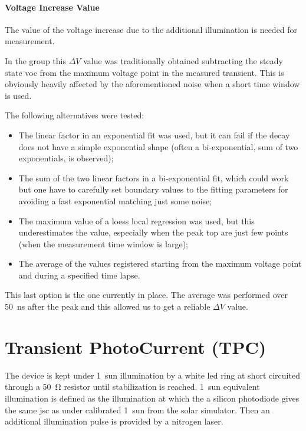 \paragraph{Voltage Increase Value}\label{tpv_deltaV}

The value of the voltage increase due to the additional illumination is needed for  measurement.

In the group this $\Delta V$ value was traditionally obtained subtracting the steady state \gls{voc} from the maximum voltage point in the measured transient. This is obviously heavily affected by the aforementioned noise when a short time window is used.

The following alternatives were tested:
\begin{itemize}
	\item The linear factor in an exponential fit was used, but it can fail if the decay does not have a simple exponential shape (often a bi-exponential, sum of two exponentials, is observed);
	\item The sum of the two linear factors in a bi-exponential fit, which could work but one have to carefully set boundary values to the fitting parameters for avoiding a fast exponential matching just some noise;
	\item The maximum value of a \gls{loess} local regression was used, but this underestimates the value, especially when the peak top are just few points (when the measurement time window is large);
	\item The average of the values registered starting from the maximum voltage point and during a specified time lapse.
\end{itemize}

This last option is the one currently in place. The average was performed over \SI{50}{ns} after the peak and this allowed us to get a reliable $\Delta V$ value.

\section{Transient PhotoCurrent (TPC)}

The device is kept under 1~sun illumination by a white \gls{led} ring at short circuited through a \SI{50}{\ohm} resistor until stabilization is reached. 1~sun equivalent illumination is defined as the illumination at which the a silicon photodiode gives the same \gls{jsc} as under calibrated 1~sun from the solar simulator. Then an additional illumination pulse is provided by a nitrogen laser.

